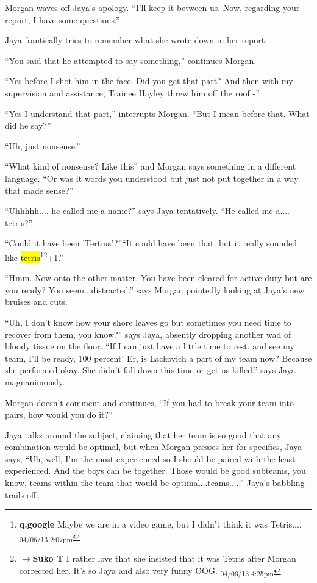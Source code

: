 Morgan waves off Jaya's apology. ``I'll keep it between us.  Now, regarding your report, I have some questions.''

Jaya frantically tries to remember what she wrote down in her report.

``You said that he attempted to say something,'' continues Morgan.

``Yes before I shot him in the face.  Did you get that part?  And then with my supervision and assistance, Trainee Hayley threw him off the roof -''

``Yes I understand that part,'' interrupts Morgan.  ``But I mean before that.  What did he say?''

``Uh, just nonsense.''

``What kind of nonsense?  Like this'' and Morgan says something in a different language. ``Or was it words you understood but just not put together in a way that made sense?''

``Uhhhhh.... he called me a name?'' says Jaya tentatively.  ``He called me a.... tetris?''

``Could it have been 'Tertius'?''``It could have been that, but it really sounded like \hl{tetris}\footnote{\textbf{q.google }Maybe we are in a video game, but I didn't think it was Tetris.... \textsubscript{04/06/13 2:07pm}}\footnote{$\rightarrow$\textbf{Suko T }I rather love that she insisted that it was Tetris after Morgan corrected her.  It's so Jaya and also very funny OOG. \textsubscript{04/06/13 4:25pm}}+1.''

``Hmm.  Now onto the other matter.  You have been cleared for active duty but are you ready?  You seem...distracted.'' says Morgan pointedly looking at Jaya's new bruises and cuts.

``Uh, I don't know how your shore leaves go but sometimes you need time to recover from them, you know?'' says Jaya, absently dropping another wad of bloody tissue on the floor.  ``If I can just have a little time to rest, and see my team, I'll be ready, 100 percent!  Er, is Lackovich a part of my team now?  Because she performed okay.  She didn't fall down this time or get us killed.'' says Jaya magnanimously.

Morgan doesn't comment and continues, ``If you had to break your team into pairs, how would you do it?''

Jaya talks around the subject, claiming that her team is so good that any combination would be optimal, but when Morgan presses her for specifics, Jaya says, ``Uh, well, I'm the most experienced so I should be paired with the least experienced.  And the boys can be together.  Those would be good subteams, you know, teams within the team that would be optimal...teams.....''  Jaya's babbling trails off.

